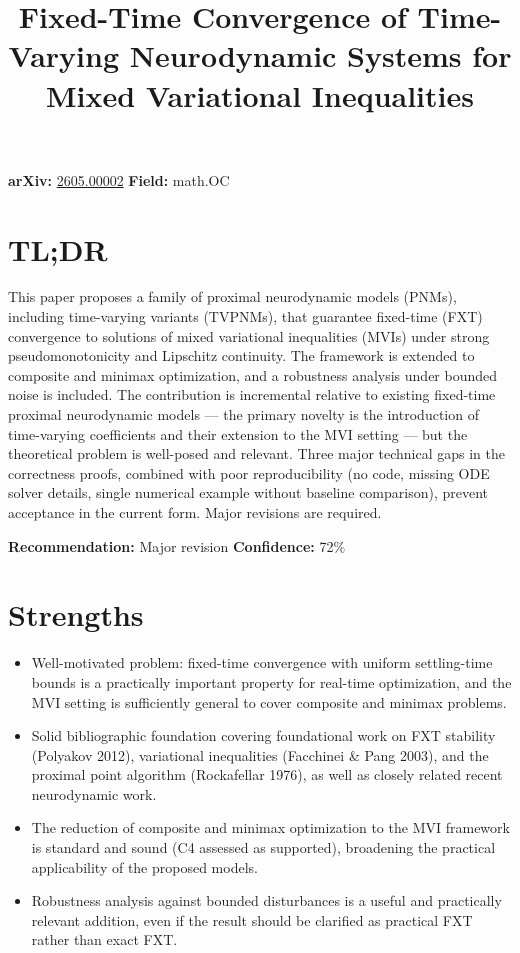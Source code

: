 \documentclass[11pt]{article}
\title{Fixed-Time Convergence of Time-Varying Neurodynamic Systems for Mixed Variational Inequalities}
\date{}
\begin{document}
\maketitle

\noindent\textbf{arXiv:} \href{https://arxiv.org/abs/2605.00002}{2605.00002} \quad \textbf{Field:} math.OC\\

\section*{TL;DR}
This paper proposes a family of proximal neurodynamic models (PNMs), including time-varying variants (TVPNMs), that guarantee fixed-time (FXT) convergence to solutions of mixed variational inequalities (MVIs) under strong pseudomonotonicity and Lipschitz continuity. The framework is extended to composite and minimax optimization, and a robustness analysis under bounded noise is included. The contribution is incremental relative to existing fixed-time proximal neurodynamic models — the primary novelty is the introduction of time-varying coefficients and their extension to the MVI setting — but the theoretical problem is well-posed and relevant. Three major technical gaps in the correctness proofs, combined with poor reproducibility (no code, missing ODE solver details, single numerical example without baseline comparison), prevent acceptance in the current form. Major revisions are required.

\textbf{Recommendation:} Major revision \quad \textbf{Confidence:} 72\%\\

\section*{Strengths}
\begin{itemize}[leftmargin=*]
  \item Well-motivated problem: fixed-time convergence with uniform settling-time bounds is a practically important property for real-time optimization, and the MVI setting is sufficiently general to cover composite and minimax problems.
  \item Solid bibliographic foundation covering foundational work on FXT stability (Polyakov 2012), variational inequalities (Facchinei \& Pang 2003), and the proximal point algorithm (Rockafellar 1976), as well as closely related recent neurodynamic work.
  \item The reduction of composite and minimax optimization to the MVI framework is standard and sound (C4 assessed as supported), broadening the practical applicability of the proposed models.
  \item Robustness analysis against bounded disturbances is a useful and practically relevant addition, even if the result should be clarified as practical FXT rather than exact FXT.
\end{itemize}
\end{document}
